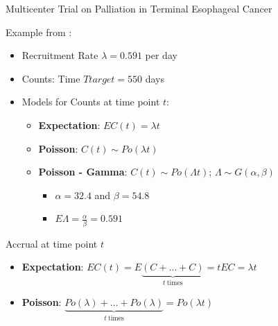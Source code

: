 \documentclass[english]{beamer}\usepackage[]{graphicx}\usepackage[]{xcolor}
\begin{document}
\begin{frame}{Multicenter Trial on Palliation in Terminal Esophageal Cancer}

Example from \cite{carter2004application}:
\begin{itemize}[label = ]
\item Recruitment Rate $\lambda = 0.591$ per day
\item Counts: Time $Ttarget = 550$ days
\item Models for Counts at time point $t$:
	\begin{itemize}[label = ]
	\item \textbf{Expectation}: $EC(t) = \lambda t$
	\item \textbf{Poisson}: $C(t) \sim Po(\lambda t)$
	\item \textbf{Poisson - Gamma}: $C(t) \sim Po (\Lambda t)$; $\Lambda \sim G(\alpha,\beta)$
	\begin{itemize}[label = ]
	\item $\alpha = 32.4$ and $\beta = 54.8$
	\item $E\Lambda = \frac{\alpha}{\beta} = 0.591$
	\end{itemize}
	\end{itemize}
\end{itemize}

\end{frame}




\begin{frame}{Accrual at time point $t$}
\begin{itemize}[label = ]
\item \textbf{Expectation}: $EC(t) = E\underbrace{(C +\ldots + C)}_{t \ \text{times}} = t E C = \lambda t$
\item \textbf{Poisson}: $\underbrace{Po (\lambda) +\ldots +Po (\lambda)}_{t \ \text{times}} = Po (\lambda t)$
\end{itemize}
\end{frame}
\end{document}
